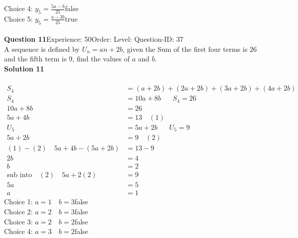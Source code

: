 \documentclass{article}
\begin{document}
Choice 4: \hspace{20pt}$y_5=\displaystyle\frac{5a-b}{25}$\hspace{20pt}false\\
Choice 5: \hspace{20pt}$y_5=\displaystyle\frac{a-3b}{25}$\hspace{20pt}true\\
\\[4pt]
\noindent\textbf{Question 11}\hspace{20pt}Experience: 50\hspace{20pt}Order: \hspace{20pt}Level: \hspace{20pt}Question-ID: 37\\[2pt]
A sequence is defined by $U_n=an+2b$, given the Sum of the first four terms is $26$ and the fifth term is $9$, find the values of $a$ and $b$.\\[4pt]
\noindent\textbf{Solution 11}\\[2pt]
\\[-35pt]\begin{align*}
S_4&=(a+2b)+(2a+2b)+(3a+2b)+(4a+2b)\\[2pt]
S_4&=10a+8b\hspace{20pt} S_4=26\\[2pt]
10a+8b&=26\\[2pt]
5a+4b&=13\quad (1)\\[12pt]
U_5&=5a+2b\hspace{20pt}U_5=9\\[2pt]
5a+2b&=9\quad (2)\\[12pt]
(1)-(2)\quad 5a+4b-(5a+2b)&=13-9\\[2pt]
2b&=4\\[2pt]
b&=2\\[12pt]
\text{sub into}\quad (2) \quad 5a+2(2)&=9\\[2pt]
5a&=5\\[2pt]
a&=1
\end{align*}
Choice 1: \hspace{20pt}$a=1\quad b=3$\hspace{20pt}false\\
Choice 2: \hspace{20pt}$a=2 \quad b=3$\hspace{20pt}false\\
Choice 3: \hspace{20pt}$a=2 \quad b=2$\hspace{20pt}false\\
Choice 4: \hspace{20pt}$a=3 \quad b=2$\hspace{20pt}false\\
\end{document}
